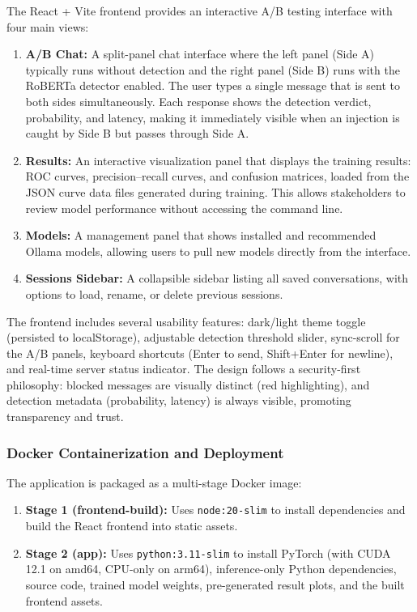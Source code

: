 \documentclass[12pt, letterpaper]{article}   %
\begin{document}
The React + Vite frontend provides an interactive A/B testing interface with four main views:

\begin{enumerate}
    \item \textbf{A/B Chat:} A split-panel chat interface where the left panel (Side A) typically runs without detection and the right panel (Side B) runs with the RoBERTa detector enabled. The user types a single message that is sent to both sides simultaneously. Each response shows the detection verdict, probability, and latency, making it immediately visible when an injection is caught by Side B but passes through Side A.

    \item \textbf{Results:} An interactive visualization panel that displays the training results: ROC curves, precision--recall curves, and confusion matrices, loaded from the JSON curve data files generated during training. This allows stakeholders to review model performance without accessing the command line.

    \item \textbf{Models:} A management panel that shows installed and recommended Ollama models, allowing users to pull new models directly from the interface.

    \item \textbf{Sessions Sidebar:} A collapsible sidebar listing all saved conversations, with options to load, rename, or delete previous sessions.
\end{enumerate}

The frontend includes several usability features: dark/light theme toggle (persisted to localStorage), adjustable detection threshold slider, sync-scroll for the A/B panels, keyboard shortcuts (Enter to send, Shift+Enter for newline), and real-time server status indicator. The design follows a security-first philosophy: blocked messages are visually distinct (red highlighting), and detection metadata (probability, latency) is always visible, promoting transparency and trust.

\subsubsection{Docker Containerization and Deployment}

The application is packaged as a multi-stage Docker image:

\begin{enumerate}
    \item \textbf{Stage 1 (frontend-build):} Uses \texttt{node:20-slim} to install dependencies and build the React frontend into static assets.
    \item \textbf{Stage 2 (app):} Uses \texttt{python:3.11-slim} to install PyTorch (with CUDA 12.1 on amd64, CPU-only on arm64), inference-only Python dependencies, source code, trained model weights, pre-generated result plots, and the built frontend assets.
\end{enumerate}
\end{document}
